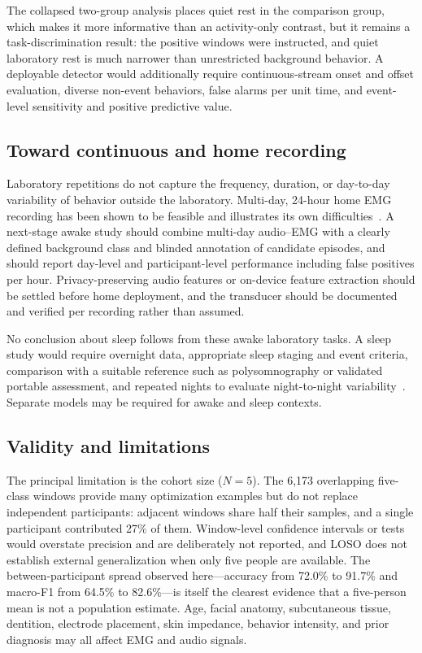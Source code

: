 \documentclass[pdflatex,sn-nature,iicol]{sn-jnl}
\begin{document}
The collapsed two-group analysis places quiet rest in the comparison group, which makes it more informative than an activity-only contrast, but it remains a task-discrimination result: the positive windows were instructed, and quiet laboratory rest is much narrower than unrestricted background behavior. A deployable detector would additionally require continuous-stream onset and offset evaluation, diverse non-event behaviors, false alarms per unit time, and event-level sensitivity and positive predictive value.

\subsection{Toward continuous and home recording}

Laboratory repetitions do not capture the frequency, duration, or day-to-day variability of behavior outside the laboratory. Multi-day, 24-hour home EMG recording has been shown to be feasible and illustrates its own difficulties~\cite{colonna2023electromyographic}. A next-stage awake study should combine multi-day audio--EMG with a clearly defined background class and blinded annotation of candidate episodes, and should report day-level and participant-level performance including false positives per hour. Privacy-preserving audio features or on-device feature extraction should be settled before home deployment, and the transducer should be documented and verified per recording rather than assumed.

No conclusion about sleep follows from these awake laboratory tasks. A sleep study would require overnight data, appropriate sleep staging and event criteria, comparison with a suitable reference such as polysomnography or validated portable assessment, and repeated nights to evaluate night-to-night variability~\cite{cidverdejo2024instrumental}. Separate models may be required for awake and sleep contexts.

\subsection{Validity and limitations}

The principal limitation is the cohort size ($N=5$). The 6,173 overlapping five-class windows provide many optimization examples but do not replace independent participants: adjacent windows share half their samples, and a single participant contributed 27\% of them. Window-level confidence intervals or tests would overstate precision and are deliberately not reported, and LOSO does not establish external generalization when only five people are available. The between-participant spread observed here---accuracy from 72.0\% to 91.7\% and macro-F1 from 64.5\% to 82.6\%---is itself the clearest evidence that a five-person mean is not a population estimate. Age, facial anatomy, subcutaneous tissue, dentition, electrode placement, skin impedance, behavior intensity, and prior diagnosis may all affect EMG and audio signals.
\end{document}
